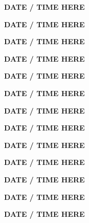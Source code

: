 \documentclass[12pt]{extbook}
\newcommand{\abstract}[2]{{
\begin{center}
\bfseries #1
\end{center}}
\par
}
\begin{document}
\clearpage

\abstract{DATE / TIME HERE}{abstracts/Brennwald}
\abstract{DATE / TIME HERE}{abstracts/Currle}
\abstract{DATE / TIME HERE}{abstracts/Daskalopoulou}
\abstract{DATE / TIME HERE}{abstracts/Dutoit}
\abstract{DATE / TIME HERE}{abstracts/Engelhardt}
\abstract{DATE / TIME HERE}{abstracts/Kimani}
\abstract{DATE / TIME HERE}{abstracts/Lightfoot}
\abstract{DATE / TIME HERE}{abstracts/Mtili}
\abstract{DATE / TIME HERE}{abstracts/Picard}
\abstract{DATE / TIME HERE}{abstracts/Roques}
\abstract{DATE / TIME HERE}{abstracts/Strauch_Zimmer}
\abstract{DATE / TIME HERE}{abstracts/vanRooyen}
\abstract{DATE / TIME HERE}{abstracts/Wang}
\end{document}
